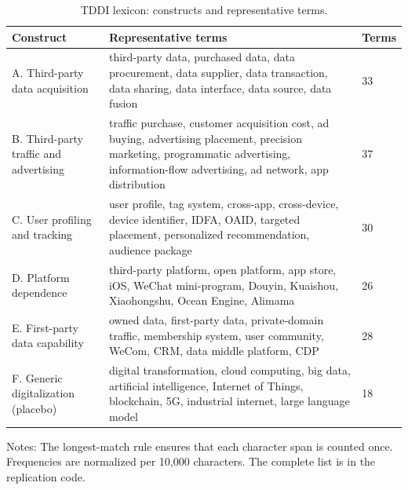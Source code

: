 \begin{table}[htbp]
\centering
\small
\caption{TDDI lexicon: constructs and representative terms.}
\label{tab:lexicon}
\begin{threeparttable}
\begin{tabular}{p{3.2cm}p{10.0cm}p{1.2cm}}
\toprule
Construct & Representative terms & Terms \\
\midrule
A. Third-party data acquisition & third-party data, purchased data, data procurement, data supplier, data transaction, data sharing, data interface, data source, data fusion & 33 \\
B. Third-party traffic and advertising & traffic purchase, customer acquisition cost, ad buying, advertising placement, precision marketing, programmatic advertising, information-flow advertising, ad network, app distribution & 37 \\
C. User profiling and tracking & user profile, tag system, cross-app, cross-device, device identifier, IDFA, OAID, targeted placement, personalized recommendation, audience package & 30 \\
D. Platform dependence & third-party platform, open platform, app store, iOS, WeChat mini-program, Douyin, Kuaishou, Xiaohongshu, Ocean Engine, Alimama & 26 \\
E. First-party data capability & owned data, first-party data, private-domain traffic, membership system, user community, WeCom, CRM, data middle platform, CDP & 28 \\
F. Generic digitalization (placebo) & digital transformation, cloud computing, big data, artificial intelligence, Internet of Things, blockchain, 5G, industrial internet, large language model & 18 \\
\bottomrule
\end{tabular}
\begin{tablenotes}[flushleft]
\footnotesize
\item Notes: The longest-match rule ensures that each character span is counted once. Frequencies are normalized per 10,000 characters. The complete list is in the replication code.
\end{tablenotes}
\end{threeparttable}
\end{table}
